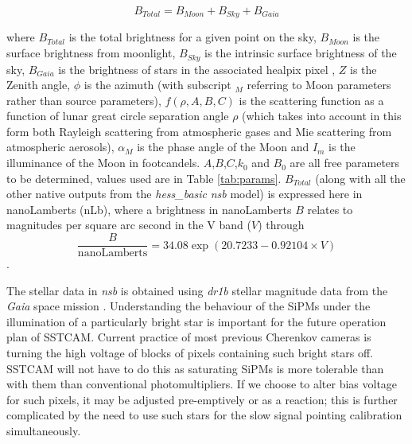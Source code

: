 \begin{equation}
    B_{Total}=B_{Moon}+B_{Sky}+B_{Gaia}
\end{equation}

where $B_{Total}$ is the total brightness for a given point on the sky, $B_{Moon}$ is the surface brightness from moonlight, $B_{Sky}$ is the intrinsic surface brightness of the sky, $B_{Gaia}$ is the brightness of stars in the associated healpix pixel \cite{healpix}, $Z$ is the Zenith angle, $\phi$ is the azimuth (with subscript $_M$ referring to Moon parameters rather than source parameters), $f(\rho,A,B,C)$ is the scattering function as a function of lunar great circle separation angle $\rho$ (which takes into account in this form both Rayleigh scattering from atmospheric gases and Mie scattering from atmospheric aerosols), $\alpha_M$ is the phase angle of the Moon and $I_m$ is the illuminance of the Moon in footcandels. $A$,$B$,$C$,$k_0$ and $B_0$ are all free parameters to be determined, values used are in Table \ref{tab:params}. $B_{Total}$ (along with all the other native outputs from the \textit{hess\_basic} \textit{nsb} model) is expressed here in nanoLamberts (nLb), where a brightness in nanoLamberts $B$ relates to magnitudes per square arc second in the V band ($V$) through
\begin{equation}
    \frac{B}{\textrm{nanoLamberts}}=34.08\exp(20.7233-0.92104\times V)
\end{equation}
\cite{Krisciunas}.

The stellar data in \textit{nsb} is obtained using \textit{dr1b} stellar magnitude data from the \textit{Gaia} space mission \cite{gaiadr1a}\cite{gaiadr1b}. Understanding the behaviour of the SiPMs under the illumination of a particularly bright star is important for the future operation plan of SSTCAM. Current practice of most previous Cherenkov cameras is turning the high voltage of blocks of pixels containing such bright stars off. SSTCAM will not have to do this as saturating SiPMs is more tolerable than with them than conventional photomultipliers. If we choose to alter bias voltage for such pixels, it may be adjusted pre-emptively or as a reaction; this is further complicated by the need to use such stars for the slow signal pointing calibration simultaneously. 

